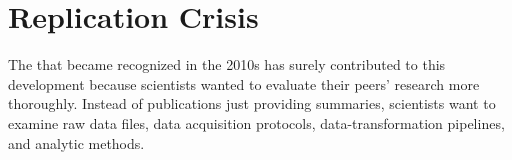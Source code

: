 
\section{Replication Crisis}\fbeg{}\begin{frame}{}

\begin{ftxt}%

The  that became recognized in the 
2010s has surely contributed to this development 
because scientists wanted to evaluate their 
peers' research more thoroughly.  Instead of 
publications just providing summaries, scientists 
want to examine raw data files, data acquisition 
protocols, data-transformation pipelines, and 
analytic methods.  

\end{ftxt}

\end{frame}

